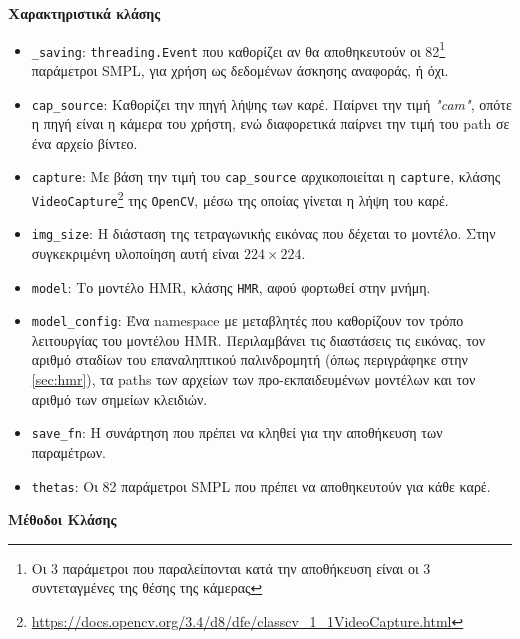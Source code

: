 \noindent\textbf{Χαρακτηριστικά κλάσης}
\begin{itemize}
	\item \texttt{\_saving}: \texttt{threading.Event} που καθορίζει αν θα αποθηκευτούν οι 82\footnote{Οι 3 παράμετροι που παραλείπονται κατά την αποθήκευση είναι οι 3 συντεταγμένες της θέσης της κάμερας} παράμετροι SMPL, για χρήση ως δεδομένων άσκησης αναφοράς, ή όχι.
	\item \texttt{cap\_source}: Καθορίζει την πηγή λήψης των καρέ. Παίρνει την τιμή \textsl{"cam"}, οπότε η πηγή είναι η κάμερα του χρήστη, ενώ διαφορετικά παίρνει την τιμή του path σε ένα αρχείο βίντεο.
	\item \texttt{capture}: Με βάση την τιμή του \texttt{cap\_source} αρχικοποιείται η \texttt{capture}, κλάσης \texttt{VideoCapture}\footnote{\href{https://docs.opencv.org/3.4/d8/dfe/classcv\_1\_1VideoCapture.html}{https://docs.opencv.org/3.4/d8/dfe/classcv\_1\_1VideoCapture.html}} της \texttt{OpenCV}, μέσω της οποίας γίνεται η λήψη του καρέ.
	\item \texttt{img\_size}: Η διάσταση της τετραγωνικής εικόνας που δέχεται το μοντέλο. Στην συγκεκριμένη υλοποίηση αυτή είναι $224 \times 224$.
	\item \texttt{model}: Το μοντέλο HMR, κλάσης \texttt{HMR}, αφού φορτωθεί στην μνήμη.
	\item \texttt{model\_config}: Ένα namespace με μεταβλητές που καθορίζουν τον τρόπο λειτουργίας του μοντέλου HMR. Περιλαμβάνει τις διαστάσεις τις εικόνας, τον αριθμό σταδίων του επαναληπτικού παλινδρομητή (όπως περιγράφηκε στην \ref{sec:hmr}), τα paths των αρχείων των προ-εκπαιδευμένων μοντέλων και τον αριθμό των σημείων κλειδιών.
	\item \texttt{save\_fn}: Η συνάρτηση που πρέπει να κληθεί για την αποθήκευση των παραμέτρων.
	\item \texttt{thetas}: Οι 82 παράμετροι SMPL που πρέπει να αποθηκευτούν για κάθε καρέ.
\end{itemize}

\noindent\textbf{Μέθοδοι Κλάσης}

